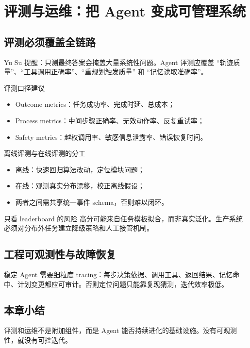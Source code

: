 \section{评测与运维：把 Agent 变成可管理系统}

\subsection{评测必须覆盖全链路}
Yu Su 提醒：只测最终答案会掩盖大量系统性问题。Agent 评测应覆盖 ``轨迹质量''、``工具调用正确率''、``重规划触发质量'' 和 ``记忆读取准确率''。

\begin{importantbox}{评测口径建议}
\begin{itemize}
    \item Outcome metrics：任务成功率、完成时延、总成本；
    \item Process metrics：中间步骤正确率、无效动作率、反复重试率；
    \item Safety metrics：越权调用率、敏感信息泄露率、错误恢复时间。
\end{itemize}
\end{importantbox}

\begin{knowledgebox}{离线评测与在线评测的分工}
\begin{itemize}
    \item 离线：快速回归算法改动，定位模块问题；
    \item 在线：观测真实分布漂移，校正离线假设；
    \item 两者之间需共享统一事件 schema，否则难以闭环。
\end{itemize}
\end{knowledgebox}

\begin{warningbox}{只看 leaderboard 的风险}
高分可能来自任务模板拟合，而非真实泛化。生产系统必须对分布外任务建立降级策略和人工接管机制。
\end{warningbox}

\subsection{工程可观测性与故障恢复}
稳定 Agent 需要细粒度 tracing：每步决策依据、调用工具、返回结果、记忆命中、计划变更都应可审计。否则定位问题只能靠复现猜测，迭代效率极低。

\subsection{本章小结}
评测和运维不是附加组件，而是 Agent 能否持续进化的基础设施。没有可观测性，就没有可控迭代。

